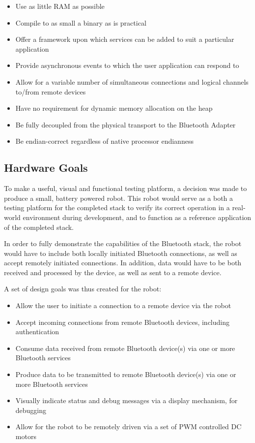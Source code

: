 \begin{itemize}
	\item Use as little RAM as possible
	\item Compile to as small a binary as is practical
	\item Offer a framework upon which services can be added to suit a particular application
	\item Provide asynchronous events to which the user application can respond to
	\item Allow for a variable number of simultaneous connections and logical channels to/from remote devices
	\item Have no requirement for dynamic memory allocation on the heap
	\item Be fully decoupled from the physical transport to the Bluetooth Adapter
	\item Be endian-correct regardless of native processor endianness
\end{itemize}

\subsection{Hardware Goals}

To make a useful, visual and functional testing platform, a decision was made to produce a small, battery powered robot. This robot would serve as a both a testing platform for the completed stack to verify its correct operation in a real-world environment during development, and to function as a reference application of the completed stack.

In order to fully demonstrate the capabilities of the Bluetooth stack, the robot would have to include both locally initiated Bluetooth connections, as well as accept remotely initiated connections. In addition, data would have to be both received and processed by the device, as well as sent to a remote device.

A set of design goals was thus created for the robot:

\begin{itemize}
	\item Allow the user to initiate a connection to a remote device via the robot
	\item Accept incoming connections from remote Bluetooth devices, including authentication
	\item Consume data received from remote Bluetooth device(s) via one or more Bluetooth services
	\item Produce data to be transmitted to remote Bluetooth device(s) via one or more Bluetooth services
	\item Visually indicate status and debug messages via a display mechanism, for debugging
	\item Allow for the robot to be remotely driven via a set of PWM controlled DC motors
\end{itemize}

